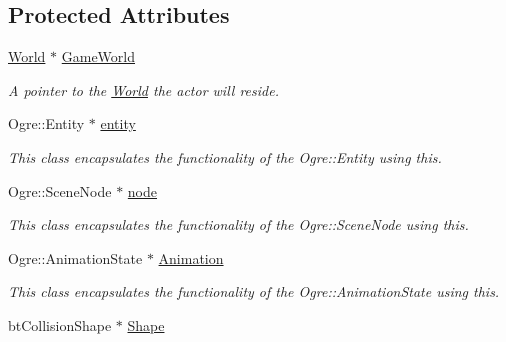 \subsection*{Protected Attributes}
\begin{DoxyCompactItemize}
\item 
\hypertarget{classphys_1_1ActorBase_a0ffbb74296ac96db26c890274df794a2}{
\hyperlink{classphys_1_1World}{World} $\ast$ \hyperlink{classphys_1_1ActorBase_a0ffbb74296ac96db26c890274df794a2}{GameWorld}}
\label{d8/d0f/classphys_1_1ActorBase_a0ffbb74296ac96db26c890274df794a2}

\begin{DoxyCompactList}\small\item\em A pointer to the \hyperlink{classphys_1_1World}{World} the actor will reside. \item\end{DoxyCompactList}\item 
\hypertarget{classphys_1_1ActorBase_ae44969ba242ca5c13a608b7467be0674}{
Ogre::Entity $\ast$ \hyperlink{classphys_1_1ActorBase_ae44969ba242ca5c13a608b7467be0674}{entity}}
\label{d8/d0f/classphys_1_1ActorBase_ae44969ba242ca5c13a608b7467be0674}

\begin{DoxyCompactList}\small\item\em This class encapsulates the functionality of the Ogre::Entity using this. \item\end{DoxyCompactList}\item 
\hypertarget{classphys_1_1ActorBase_a687bfa0cc44adf715651c7ac41a46321}{
Ogre::SceneNode $\ast$ \hyperlink{classphys_1_1ActorBase_a687bfa0cc44adf715651c7ac41a46321}{node}}
\label{d8/d0f/classphys_1_1ActorBase_a687bfa0cc44adf715651c7ac41a46321}

\begin{DoxyCompactList}\small\item\em This class encapsulates the functionality of the Ogre::SceneNode using this. \item\end{DoxyCompactList}\item 
\hypertarget{classphys_1_1ActorBase_aed2853b0a97e12aa73f6167aa572e5f3}{
Ogre::AnimationState $\ast$ \hyperlink{classphys_1_1ActorBase_aed2853b0a97e12aa73f6167aa572e5f3}{Animation}}
\label{d8/d0f/classphys_1_1ActorBase_aed2853b0a97e12aa73f6167aa572e5f3}

\begin{DoxyCompactList}\small\item\em This class encapsulates the functionality of the Ogre::AnimationState using this. \item\end{DoxyCompactList}\item 
\hypertarget{classphys_1_1ActorBase_a643613ce7abb4b6d4352bab036b7cf69}{
btCollisionShape $\ast$ \hyperlink{classphys_1_1ActorBase_a643613ce7abb4b6d4352bab036b7cf69}{Shape}}
\label{d8/d0f/classphys_1_1ActorBase_a643613ce7abb4b6d4352bab036b7cf69}


\end{DoxyCompactItemize}
